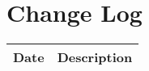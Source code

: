 \section{Change Log}
\label{sec:changelog}

\begin{tabular}{|c|c|}
\hline
Date & Description \\ \hline
\end{tabular}
